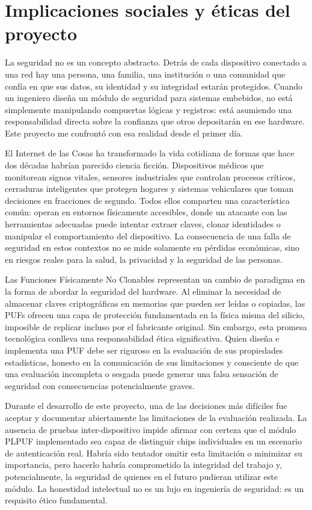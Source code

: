 \chapter{Implicaciones sociales y éticas del proyecto}
\label{ch:anexo_etica}


La seguridad no es un concepto abstracto. Detrás de cada dispositivo conectado
a una red hay una persona, una familia, una institución o una comunidad que
confía en que sus datos, su identidad y su integridad estarán protegidos. Cuando
un ingeniero diseña un módulo de seguridad para sistemas embebidos, no está
simplemente manipulando compuertas lógicas y registros: está asumiendo una
responsabilidad directa sobre la confianza que otros depositarán en ese
hardware. Este proyecto me confrontó con esa realidad desde el primer día.

El Internet de las Cosas ha transformado la vida cotidiana de formas que hace
dos décadas habrían parecido ciencia ficción. Dispositivos médicos que monitorean
signos vitales, sensores industriales que controlan procesos críticos, cerraduras
inteligentes que protegen hogares y sistemas vehiculares que toman decisiones en
fracciones de segundo. Todos ellos comparten una característica común: operan en
entornos físicamente accesibles, donde un atacante con las herramientas adecuadas
puede intentar extraer claves, clonar identidades o manipular el comportamiento
del dispositivo. La consecuencia de una falla de seguridad en estos contextos no
se mide solamente en pérdidas económicas, sino en riesgos reales para la
salud, la privacidad y la seguridad de las personas.

Las Funciones Físicamente No Clonables representan un cambio de paradigma en la
forma de abordar la seguridad del hardware. Al eliminar la necesidad de almacenar
claves criptográficas en memorias que pueden ser leídas o copiadas, las PUFs
ofrecen una capa de protección fundamentada en la física misma del silicio,
imposible de replicar incluso por el fabricante original. Sin embargo, esta
promesa tecnológica conlleva una responsabilidad ética significativa. Quien diseña
e implementa una PUF debe ser riguroso en la evaluación de sus propiedades
estadísticas, honesto en la comunicación de sus limitaciones y consciente de que
una evaluación incompleta o sesgada puede generar una falsa sensación de
seguridad con consecuencias potencialmente graves.

Durante el desarrollo de este proyecto, una de las decisiones más difíciles fue
aceptar y documentar abiertamente las limitaciones de la evaluación realizada. La
ausencia de pruebas inter-dispositivo impide afirmar con certeza que el módulo
PLPUF implementado sea capaz de distinguir chips individuales en un escenario de
autenticación real. Habría sido tentador omitir esta limitación o minimizar su
importancia, pero hacerlo habría comprometido la integridad del trabajo y,
potencialmente, la seguridad de quienes en el futuro pudieran utilizar este
módulo. La honestidad intelectual no es un lujo en ingeniería de seguridad: es
un requisito ético fundamental.

